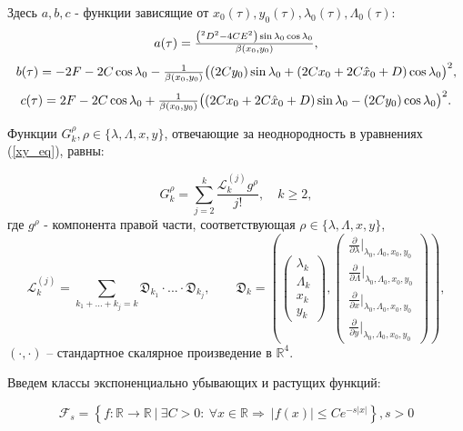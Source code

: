 Здесь $a,b,c$ - функции зависящие от $x_0(\tau), y_0(\tau), \lambda_0(\tau), \Lambda_0(\tau)$:
\begin{equation}
\mathsmaller{
a(\tau) = \frac{\left( ^2 D^2 - 4CE^2\right) \sin \lambda_0 \cos \lambda_0}{\beta(x_0,y_0)},
}
\end{equation}
\begin{equation}
\mathsmaller{
b(\tau) = -2F - 2C \cos \lambda_0 - \frac{1}{\beta(x_0,y_0)} \big( (2Cy_0)\sin \lambda_0 + (2Cx_0+2C \hat x_0 + D)\cos \lambda_0  \big)^2,
}
\end{equation}
\begin{equation}
\mathsmaller{
c(\tau) = 2F - 2C \cos \lambda_0 + \frac{1}{\beta(x_0,y_0)} \big( (2Cx_0+2C \hat x_0 + D)\sin \lambda_0 - (2Cy_0)\cos \lambda_0  \big)^2.
}
\end{equation}

Функции $G_k^\rho, \rho \in \{\lambda,\Lambda,x,y\}$, отвечающие за неоднородность в уравнениях (\ref{xy_eq}), равны:

$$G_k^\rho = \sum_{j=2}^{k} \frac{\mathcal{L}_k^{(j)} g^\rho }{j!}, \quad k \ge 2,$$
где $g^\rho$ - компонента правой части, соответствующая $\rho \in \{ \lambda, \Lambda, x, y \}$,
$$\mathcal{L}_k^{(j)} = \sum_{k_1+...+k_j = k} \mathfrak{D}_{k_1} \cdot ... \cdot \mathfrak{D}_{k_j}, \qquad \mathfrak{D}_k = \left( \begin{pmatrix} \lambda_k\\ \Lambda_k \\ x_k \\ y_k \end{pmatrix},\begin{pmatrix} \frac{\partial}{\partial \lambda} |_{\lambda_0,\Lambda_0,x_0,y_0}\\ \frac{\partial}{\partial \Lambda} |_{\lambda_0,\Lambda_0,x_0,y_0} \\ \frac{\partial}{\partial x} |_{\lambda_0,\Lambda_0,x_0,y_0} \\ \frac{\partial}{\partial y} |_{\lambda_0,\Lambda_0,x_0,y_0} \end{pmatrix} \right),$$
$(\cdot,\cdot)$ -- стандартное скалярное произведение в $\mathbb{R}^4$.

Введем классы экспоненциально убывающих и растущих функций:

\[
\mathcal{F}_s = \left\{ f \colon \mathbb{R} \to \mathbb{R} \ \Big| \ \exists C > 0: \ \forall x \in \mathbb{R} \Rightarrow \ |f(x)| \leq C e^{-s|x|} \right\}, s > 0
\]

